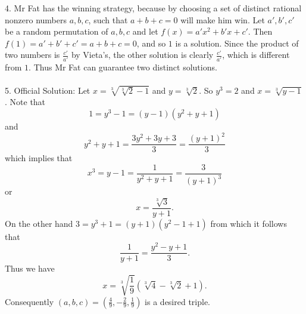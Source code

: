 \documentclass{article}
\begin{document}
4. Mr Fat has the winning strategy, because by choosing a set of distinct rational nonzero numbers $a,b,c$, such that $a+b+c=0$ will make him win. Let $a', b', c'$ be a random permutation of $a,b,c$ and let $f(x)=a'x^2+b'x+c'$. Then $f(1)=a'+b'+c'=a+b+c=0$, and so $1$ is a solution. Since the product of two numbers is $\frac{c'}{a'}$ by Vieta's, the other solution is clearly $\frac{c'}{a'}$, which is different from $1$. Thus Mr Fat can guarantee two distinct solutions.     \\\\
5. Official Solution: Let $x=\sqrt[3]{\sqrt[3]{2}-1}$ and $y = \sqrt[3]{2}$. So $y^3=2$ and $x=\sqrt[3]{y-1}$. Note that $$1=y^3-1=(y-1)(y^2+y+1)$$ and $$y^2+y+1=\frac{3y^2+3y+3}{3}=\frac{(y+1)^2}{3}$$ which implies that $$x^3=y-1=\frac{1}{y^2+y+1}=\frac{3}{(y+1)^3}$$ or $$x=\frac{\sqrt[3]{3}}{y+1}.$$ On the other hand $3=y^3+1=(y+1)(y^2-1+1)$ from which it follows that $$\frac{1}{y+1}=\frac{y^2-y+1}{3}.$$ Thus we have $$x=\sqrt[3]{\frac{1}{9}}(\sqrt[3]{4}-\sqrt[3]{2}+1).$$ Consequently $(a,b,c) = (\frac{4}{9}, -\frac{2}{9}, \frac{1}{9})$ is a desired triple. \\\\
\end{document}
